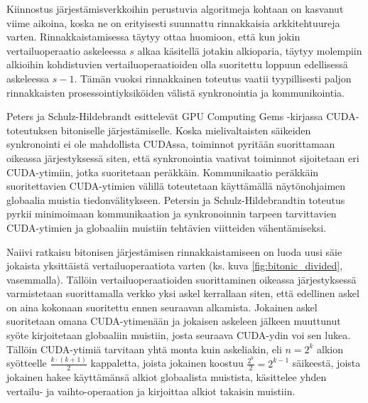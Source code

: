 \documentclass[a4paper,11pt]{article}
\begin{document}
Kiinnostus järjestämisverkkoihin perustuvia algoritmeja kohtaan on kasvanut viime aikoina, koska ne on erityisesti suunnattu rinnakkaisia arkkitehtuureja varten. Rinnakkaistamisessa täytyy ottaa huomioon, että kun jokin vertailuoperaatio askeleessa $s$ alkaa käsitellä jotakin alkioparia, täytyy molempiin alkioihin kohdistuvien vertailuoperaatioiden olla suoritettu loppuun edellisessä askeleessa $s - 1$. Tämän vuoksi rinnakkainen toteutus vaatii tyypillisesti paljon rinnakkaisten prosessointiyksiköiden välistä synkronointia ja kommunikointia.

Peters ja Schulz-Hildebrandt \cite{peters2012gems} esittelevät GPU Computing Gems -kirjassa CUDA-toteutuksen bitoniselle järjestämiselle. Koska mielivaltaisten säikeiden synkronointi ei ole mahdollista CUDAssa, toiminnot pyritään suorittamaan oikeassa järjestyksessä siten, että synkronointia vaativat toiminnot sijoitetaan eri CUDA-ytimiin, jotka suoritetaan peräkkäin. Kommunikaatio peräkkäin suoritettavien CUDA-ytimien välillä toteutetaan käyttämällä näytönohjaimen globaalia muistia tiedonvälitykseen. Petersin ja Schulz-Hildebrandtin toteutus pyrkii minimoimaan kommunikaation ja synkronoinnin tarpeen tarvittavien CUDA-ytimien ja globaaliin muistiin tehtävien viitteiden vähentämiseksi.

Naiivi ratkaisu bitonisen järjestämisen rinnakkaistamiseen on luoda uusi säie jokaista yksittäistä vertailuoperaatiota varten (ks. kuva \ref{fig:bitonic_divided}, vasemmalla). Tällöin vertailuoperaatioiden suorittaminen oikeassa järjestyksessä varmistetaan suorittamalla verkko yksi askel kerrallaan siten, että edellinen askel on aina kokonaan suoritettu ennen seuraavan alkamista. Jokainen askel suoritetaan omana CUDA-ytimenään ja jokaisen askeleen jälkeen muuttunut syöte kirjoitetaan globaaliin muistiin, josta seuraava CUDA-ydin voi sen lukea. Tällöin CUDA-ytimiä tarvitaan yhtä monta kuin askeliakin, eli $n = 2^k$ alkion syötteelle $\frac{k \cdot (k + 1)}{2}$ kappaletta, joista jokainen koostuu $\frac{2^k}{2} = 2^{k-1}$ säikeestä, joista jokainen hakee käyttämänsä alkiot globaalista muistista, käsittelee yhden vertailu- ja vaihto-operaation ja kirjoittaa alkiot takaisin muistiin.
\end{document}
